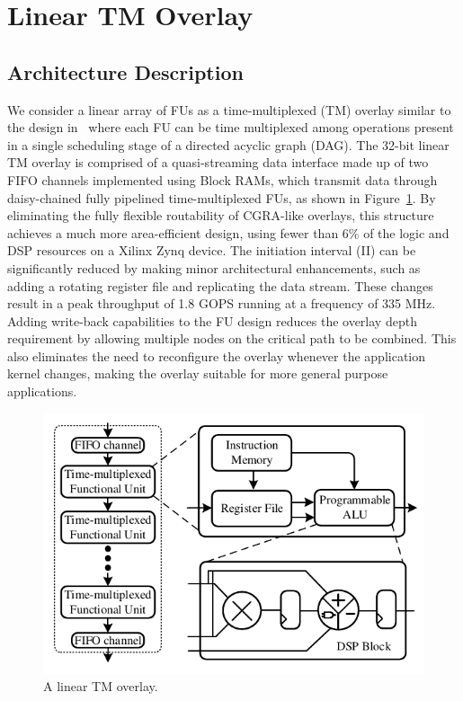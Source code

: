 \section{Linear TM Overlay}
\label{section_3}
\subsection{Architecture Description}
We consider a linear array of FUs as a time-multiplexed (TM) overlay similar to the design in~\cite{li2018time} where each FU can be time multiplexed among operations present in a single scheduling stage of a directed acyclic graph (DAG). 
The 32-bit linear TM overlay is comprised of a quasi-streaming data interface made up of two FIFO channels implemented using Block RAMs, which transmit data through daisy-chained fully pipelined time-multiplexed FUs, as shown in Figure~\ref{overlay}. 
By eliminating the fully flexible routability of CGRA-like overlays, this structure achieves a much more area-efficient design, using fewer than 6\% of the logic and DSP resources on a Xilinx Zynq device. 
The initiation interval (II) can be significantly reduced by making minor architectural enhancements, such as adding a rotating register file and replicating the data stream. 
These changes result in a peak throughput of 1.8 GOPS running at a frequency of 335 MHz. %
Adding write-back capabilities to the FU design reduces the overlay depth requirement by allowing multiple nodes on the critical path to be combined. 
This also eliminates the need to reconfigure the overlay whenever the application kernel changes, making the overlay suitable for more general purpose applications. 


\begin{figure}
    \centering
	\includegraphics[width=\columnwidth]{Figures/overlay.pdf}
	\caption{A linear TM overlay.}
	\label{overlay}
\end{figure}


